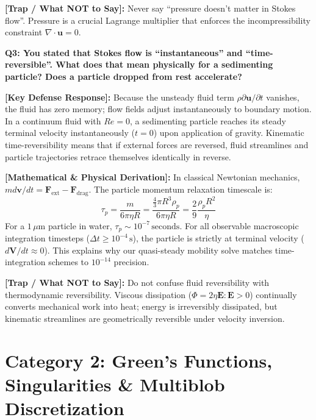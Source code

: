 \documentclass[11pt,a4paper]{article}
\newcommand{\question}[2]{
    \vspace{0.4cm}
    \noindent\colorbox{blue!10}{\parbox{\dimexpr\textwidth-2\fboxsep\relax}{
        \textbf{#1: #2}
    }}
    \vspace{0.2cm}
}
\newcommand{\shortanswer}[1]{
    \noindent\textbf{\textcolor{green!50!black}{[Key Defense Response]:}} #1
    \vspace{0.2cm}
}
\newcommand{\deepdetails}[1]{
    \noindent\textbf{\textcolor{blue!60!black}{[Mathematical \& Physical Derivation]:}} #1
    \vspace{0.2cm}
}
\newcommand{\pitfall}[1]{
    \noindent\textbf{\textcolor{red!70!black}{[Trap / What NOT to Say]:}} #1
    \vspace{0.3cm}
}
\begin{document}
\pitfall{Never say ``pressure doesn't matter in Stokes flow''. Pressure is a crucial Lagrange multiplier that enforces the incompressibility constraint $\nabla \cdot \mathbf{u} = 0$.}

\vspace{0.4cm}
\question{Q3}{You stated that Stokes flow is ``instantaneous'' and ``time-reversible''. What does that mean physically for a sedimenting particle? Does a particle dropped from rest accelerate?}

\shortanswer{Because the unsteady fluid term $\rho \partial \mathbf{u}/\partial t$ vanishes, the fluid has zero memory; flow fields adjust instantaneously to boundary motion. In a continuum fluid with $Re = 0$, a sedimenting particle reaches its steady terminal velocity instantaneously ($t = 0$) upon application of gravity. Kinematic time-reversibility means that if external forces are reversed, fluid streamlines and particle trajectories retrace themselves identically in reverse.}

\deepdetails{
In classical Newtonian mechanics, $m d\mathbf{v}/dt = \mathbf{F}_{\text{ext}} - \mathbf{F}_{\text{drag}}$. The particle momentum relaxation timescale is:
\begin{equation}
    \tau_p = \frac{m}{6\pi\eta R} = \frac{\frac{4}{3}\pi R^3 \rho_p}{6\pi\eta R} = \frac{2}{9} \frac{\rho_p R^2}{\eta}
\end{equation}
For a $1\,\mu\text{m}$ particle in water, $\tau_p \sim 10^{-7}\,\text{seconds}$. For all observable macroscopic integration timesteps ($\Delta t \ge 10^{-4}\,\text{s}$), the particle is strictly at terminal velocity ($d\mathbf{V}/dt \approx 0$). This explains why our quasi-steady mobility solve matches time-integration schemes to $10^{-14}$ precision.
}

\pitfall{Do not confuse fluid reversibility with thermodynamic reversibility. Viscous dissipation ($\Phi = 2\eta \mathbf{E}:\mathbf{E} > 0$) continually converts mechanical work into heat; energy is irreversibly dissipated, but kinematic streamlines are geometrically reversible under velocity inversion.}

\section{Category 2: Green's Functions, Singularities \& Multiblob Discretization}
\end{document}
